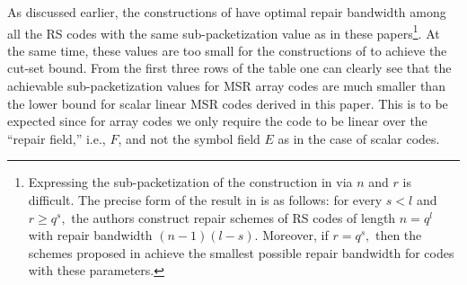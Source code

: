 \documentclass[11pt,onecolumn]{IEEEtran}
\begin{document}
\begin{enumerate}[(1)]
As discussed earlier, the constructions of \cite{Guruswami16,Dau17} have optimal repair bandwidth among all the RS codes with the same sub-packetization value as in these papers\footnote{Expressing the sub-packetization of the construction in \cite{Dau17} via $n$ and $r$ is
difficult. The precise form of the result in \cite{Dau17} is as follows: for every $s<l$ and $r\ge q^s,$ the authors construct repair schemes of RS codes of length $n=q^l$
with repair bandwidth $(n-1)(l-s).$ Moreover, if $r=q^s,$ then the schemes proposed in \cite{Dau17} achieve the smallest possible repair bandwidth for codes with these parameters.}.
At the same time, these values are too small for the constructions of \cite{Guruswami16,Dau17} to achieve the cut-set bound.
From the first three rows of the table one can clearly see that the achievable sub-packetization values for MSR array codes are much smaller than the lower bound for scalar linear MSR codes derived in this paper. This is to be expected since for array codes we only require the code to be linear over the ``repair field,'' i.e., $F$, and not the symbol field $E$ as in the case of scalar codes. 
\end{enumerate}
\end{document}
